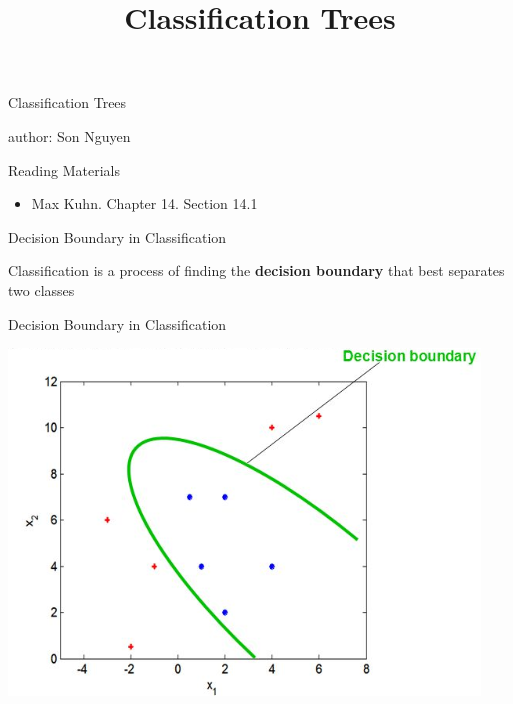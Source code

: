 \documentclass[
  ignorenonframetext,
]{beamer}
\title{Classification Trees}
\author{}
\date{\vspace{-2.5em}}
\providecommand{\tightlist}{%
  \setlength{\itemsep}{0pt}\setlength{\parskip}{0pt}}
\begin{document}
\frame{\titlepage}

\begin{frame}{Classification Trees}
\protect\hypertarget{classification-trees}{}

author: Son Nguyen

\end{frame}

\begin{frame}{Reading Materials}
\protect\hypertarget{reading-materials}{}

\begin{itemize}
\tightlist
\item
  Max Kuhn. Chapter 14. Section 14.1
\end{itemize}

\end{frame}

\begin{frame}{Decision Boundary in Classification}
\protect\hypertarget{decision-boundary-in-classification}{}

Classification is a process of finding the \textbf{decision boundary}
that best separates two classes

\end{frame}

\begin{frame}{Decision Boundary in Classification}
\protect\hypertarget{decision-boundary-in-classification-1}{}

\includegraphics{images2/db.png}

\end{frame}
\end{document}
